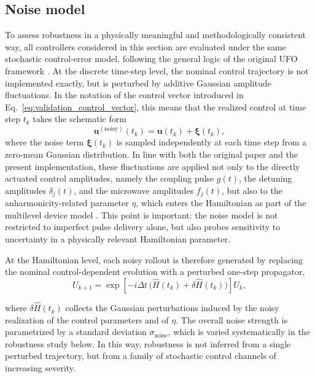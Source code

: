 \subsection{Noise model}
\label{subsec:noise_model}
To assess robustness in a physically meaningful and methodologically consistent way, all controllers considered in this section are evaluated under the same stochastic control-error model, following the general logic of the original UFO framework \cite{Niu2019}. At the discrete time-step level, the nominal control trajectory is not implemented exactly, but is perturbed by additive Gaussian amplitude fluctuations. In the notation of the control vector introduced in Eq.~\eqref{eq:validation_control_vector}, this means that the realized control at time step \(t_k\) takes the schematic form
\begin{equation}
\bm{u}^{(\mathrm{noisy})}(t_k)
=
\bm{u}(t_k)+\bm{\xi}(t_k),
\label{eq:robustness_noisy_control_vector}
\end{equation}
where the noise term \(\bm{\xi}(t_k)\) is sampled independently at each time step from a zero-mean Gaussian distribution. In line with both the original paper and the present implementation, these fluctuations are applied not only to the directly actuated control amplitudes, namely the coupling pulse \(g(t)\), the detuning amplitudes \(\delta_j(t)\), and the microwave amplitudes \(f_j(t)\), but also to the anharmonicity-related parameter \(\eta\), which enters the Hamiltonian as part of the multilevel device model \cite{Niu2019}. This point is important: the noise model is not restricted to imperfect pulse delivery alone, but also probes sensitivity to uncertainty in a physically relevant Hamiltonian parameter.

At the Hamiltonian level, each noisy rollout is therefore generated by replacing the nominal control-dependent evolution with a perturbed one-step propagator,
\begin{equation}
U_{k+1}
=
\exp\!\left[
-i\Delta t\,
\bigl(
\hat{H}(t_k)+\delta \hat{H}(t_k)
\bigr)
\right]
U_k,
\label{eq:robustness_noisy_propagator}
\end{equation}


where \(\delta \hat{H}(t_k)\) collects the Gaussian perturbations induced by the noisy realization of the control parameters and of \(\eta\). The overall noise strength is parametrized by a standard deviation \(\sigma_{\mathrm{noise}}\), which is varied systematically in the robustness study below. In this way, robustness is not inferred from a single perturbed trajectory, but from a family of stochastic control channels of increasing severity.

